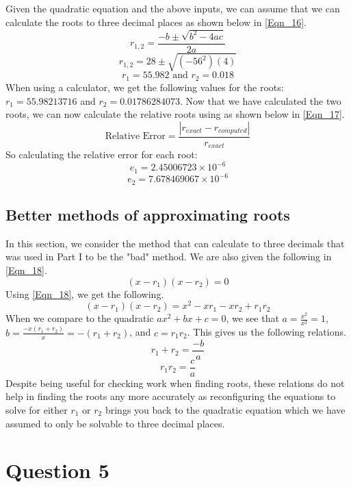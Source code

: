 \documentclass{article}
\begin{document}
\subsection{}
Given the quadratic equation and the above inputs, we can assume that we can calculate the roots to three decimal places as shown below in \ref{Eqn_16}.
\begin{equation}
    \label{Eqn_16}
    r_{1,2} = \frac{-b\pm \sqrt{b^2-4ac}}{2a}
\end{equation}
\[
r_{1,2} = 28 \pm \sqrt{(-56^2)(4)}
\]
\[r_1 = 55.982 \mbox{ and } r_2 = 0.018\]
When using a calculator, we get the following values for the roots: \(r_1 = 55.98213716\) and \(r_2 = 0.01786284073\).
Now that we have calculated the two roots, we can now calculate the relative roots using as shown below in \ref{Eqn_17}.
\begin{equation}
    \label{Eqn_17}
    \mbox{Relative Error} = \frac{|r_{exact} - r_{computed}|}{r_{exact}}
\end{equation}
So calculating the relative error for each root:
\[
e_1 = 2.45006723\times10^{-6}
\]
\[
e_2 = 7.678469067\times10^{-6}
\]
\subsection{Better methods of approximating roots}
In this section, we consider the method that can calculate to three decimals that was used in Part I to be the "bad" method. We are also given the following in \ref{Eqn_18}.
\begin{equation}
    \label{Eqn_18}
    (x-r_1)(x-r_2) = 0
\end{equation}
Using \ref{Eqn_18}, we get the following.
\[
(x-r_1)(x-r_2) = x^2 - xr_1 - xr_2 + r_1r_2
\]
When we compare to the quadratic \(ax^2 + bx + c = 0\), we see that \(a = \frac{x^2}{x^2} = 1\), \(b = \frac{-x(r_1+r_2)}{x} = -(r_1+r_2)\), and \(c = r_1r_2\). This gives us the following relations.
\[
r_1 + r_2 = \frac{-b}{a}
\]
\[
r_1r_2 = \frac{c}{a}
\]
Despite being useful for checking work when finding roots, these relations do not help in finding the roots any more accurately as reconfiguring the equations to solve for either \(r_1\) or \(r_2\) brings you back to the quadratic equation which we have assumed to only be solvable to three decimal places.


\section{Question 5}
\end{document}
